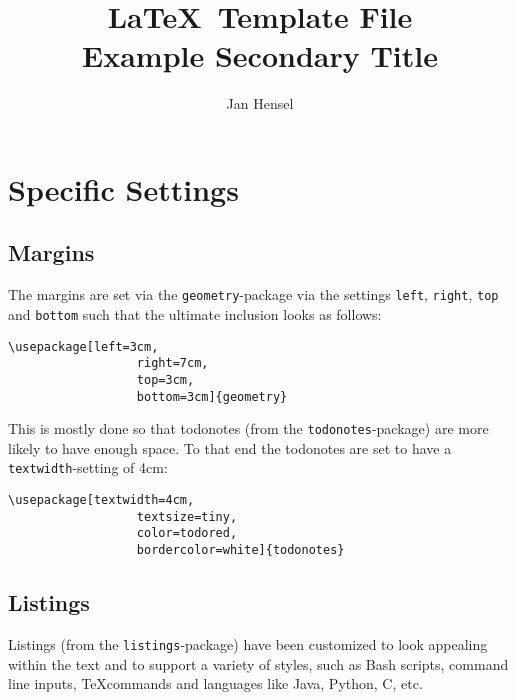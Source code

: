\documentclass{article}
\author{Jan Hensel}
\title{\textbf{\LaTeX\ Template File}\\
        Example Secondary Title}
\begin{document}
\maketitle

\section{Specific Settings}
  \subsection{Margins}
    The margins are set via the \texttt{geometry}-package via the settings
    \texttt{left}, \texttt{right}, \texttt{top} and \texttt{bottom} such that
    the ultimate inclusion looks as follows: 
    \begin{lstlisting}[style=latex,gobble=6]
      \usepackage[left=3cm,
                  right=7cm,
                  top=3cm,
                  bottom=3cm]{geometry}
    \end{lstlisting}
    This is mostly done so that todonotes (from the \texttt{todonotes}-package)
    are more likely to have enough space. To that end the todonotes are set to
    have a \texttt{textwidth}-setting of 4cm: 
    \begin{lstlisting}[style=latex,gobble=6]
      \usepackage[textwidth=4cm,
                  textsize=tiny,
                  color=todored,
                  bordercolor=white]{todonotes}
    \end{lstlisting}

  \subsection{Listings}
    Listings (from the \texttt{listings}-package) have been customized to look
    appealing within the text and to support a variety of styles, such as Bash
    scripts, command line inputs, \TeX commands and languages like Java,
    Python, C, etc. 
\end{document}

